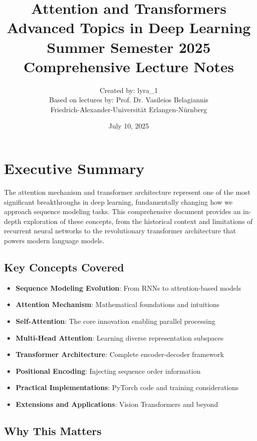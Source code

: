 \documentclass[11pt]{article}
\title{\textbf{Attention and Transformers}\\[0.5cm]
\large Advanced Topics in Deep Learning\\
Summer Semester 2025\\[0.3cm]
Comprehensive Lecture Notes}
\author{Created by: lyra\_1\\
Based on lectures by: Prof. Dr. Vasileios Belagiannis\\
Friedrich-Alexander-Universität Erlangen-Nürnberg}
\date{July 10, 2025}
\begin{document}
\maketitle
\newpage
\tableofcontents
\newpage

\section{Executive Summary}

The attention mechanism and transformer architecture represent one of the most significant breakthroughs in deep learning, fundamentally changing how we approach sequence modeling tasks. This comprehensive document provides an in-depth exploration of these concepts, from the historical context and limitations of recurrent neural networks to the revolutionary transformer architecture that powers modern language models.

\subsection{Key Concepts Covered}

\begin{itemize}
    \item \textbf{Sequence Modeling Evolution}: From RNNs to attention-based models
    \item \textbf{Attention Mechanism}: Mathematical foundations and intuitions
    \item \textbf{Self-Attention}: The core innovation enabling parallel processing
    \item \textbf{Multi-Head Attention}: Learning diverse representation subspaces
    \item \textbf{Transformer Architecture}: Complete encoder-decoder framework
    \item \textbf{Positional Encoding}: Injecting sequence order information
    \item \textbf{Practical Implementations}: PyTorch code and training considerations
    \item \textbf{Extensions and Applications}: Vision Transformers and beyond
\end{itemize}

\subsection{Why This Matters}
\end{document}
